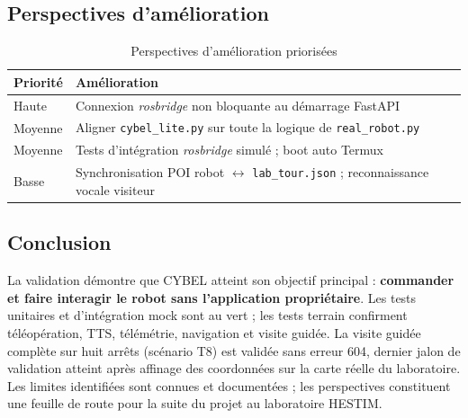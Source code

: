 \subsection{Perspectives d'amélioration}

\begin{table}[H]
\centering
\caption{Perspectives d'amélioration priorisées}
\label{tab:perspectives}
\small
\begin{tabular}{|p{2.3cm}|p{9.3cm}|}
\hline
\textbf{Priorité} & \textbf{Amélioration} \\
\hline
Haute & Connexion \textit{rosbridge} non bloquante au démarrage FastAPI \\
\hline
Moyenne & Aligner \texttt{cybel\_lite.py} sur toute la logique de \texttt{real\_robot.py} \\
\hline
Moyenne & Tests d'intégration \textit{rosbridge} simulé ; boot auto Termux \\
\hline
Basse & Synchronisation POI robot $\leftrightarrow$ \texttt{lab\_tour.json} ; reconnaissance vocale visiteur \\
\hline
\end{tabular}
\end{table}


\subsection{Conclusion}

La validation démontre que CYBEL atteint son objectif principal : \textbf{commander
et faire interagir le robot sans l'application propriétaire}. Les tests
unitaires et d'intégration mock sont au vert ; les tests terrain confirment
téléopération, TTS, télémétrie, navigation et visite guidée. La visite
guidée complète sur huit arrêts (scénario T8) est validée sans erreur 604,
dernier jalon de validation atteint après affinage des coordonnées sur la
carte réelle du laboratoire. Les limites identifiées sont connues et
documentées ; les perspectives constituent une feuille de route pour la
suite du projet au laboratoire HESTIM.
